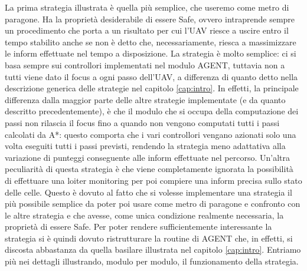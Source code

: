 La prima strategia illustrata è quella più semplice, che useremo come metro di paragone. Ha la proprietà desiderabile di essere Safe, ovvero intraprende sempre un procedimento che porta a un risultato per cui l'UAV riesce a uscire entro il tempo stabilito anche se non è detto che, necessariamente, riesca a massimizzare le inform effettuate nel tempo a disposizione.
La strategia è molto semplice: ci si basa sempre sui controllori implementati nel modulo AGENT, tuttavia non a tutti viene dato il focus a ogni passo dell'UAV, a differenza di quanto detto nella descrizione generica delle strategie nel capitolo \ref{cap:intro}.
In effetti, la principale differenza dalla maggior parte delle altre strategie implementate (e da quanto descritto precedentemente), è che il modulo che si occupa della computazione dei passi non rilascia il focus fino a quando non vengono computati tutti i passi calcolati da A*: questo comporta che i vari controllori vengano azionati solo una volta eseguiti tutti i passi previsti, rendendo la strategia meno adattativa alla variazione di punteggi conseguente alle inform effettuate nel percorso.
Un'altra peculiarità di questa strategia è che viene completamente ignorata la possibilità di effettuare una loiter monitoring per poi compiere una inform precisa sullo stato delle celle. Questo è dovuto al fatto che si volesse implementare una strategia il più possibile semplice da poter poi usare come metro di paragone e confronto con le altre strategia e che avesse, come unica condizione realmente necessaria, la proprietà di essere Safe.
Per poter rendere sufficientemente interessante la strategia si è quindi dovuto ristrutturare la routine di AGENT che, in effetti, si discosta abbastanza da quella basilare illustrata nel capitolo \ref{cap:intro}. Entriamo più nei dettagli illustrando, modulo per modulo, il funzionamento della strategia.
